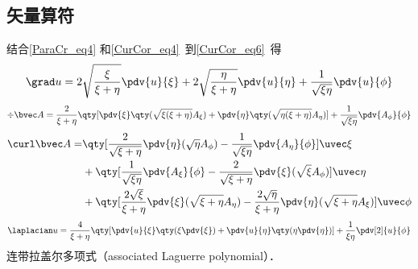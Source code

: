 \subsection{矢量算符}
结合\autoref{ParaCr_eq4} 和\autoref{CurCor_eq4}~到\autoref{CurCor_eq6}~得
\begin{equation}
\grad u = 2\sqrt{\frac{\xi}{\xi + \eta}}\pdv{u}{\xi} + 2\sqrt{\frac{\eta}{\xi + \eta}}\pdv{u}{\eta} + \frac{1}{\sqrt{\xi\eta}}\pdv{u}{\phi}
\end{equation}
\begin{equation}
\div \bvec A = \frac{2}{\xi + \eta}\qty[\pdv{\xi}\qty(\sqrt{\xi(\xi+\eta)}A_\xi) + \pdv{\eta}\qty(\sqrt{\eta(\xi+\eta)}A_\eta)] + \frac{1}{\sqrt{\xi\eta}} \pdv{A_\phi}{\phi}
\end{equation}
\begin{equation}
\begin{aligned}
\curl \bvec A = &\qty[\frac{2}{\sqrt{\xi+\eta}}\pdv{\eta} (\sqrt{\eta}A_\phi) - \frac{1}{\sqrt{\xi\eta}}\pdv{A_\eta}{\phi}]\uvec \xi\\
&+\qty[\frac{1}{\sqrt{\xi\eta}}\pdv{A_\xi}{\phi} - \frac{2}{\sqrt{\xi+\eta}}\pdv{\xi}(\sqrt{\xi}A_\phi)]\uvec\eta\\
&+\qty[\frac{2\sqrt{\xi}}{\xi+\eta}\pdv{\xi}(\sqrt{\xi+\eta}A_\eta) - \frac{2\sqrt{\eta}}{\xi+\eta}\pdv{\eta}(\sqrt{\xi+\eta}A_\xi)]\uvec\phi
\end{aligned}
\end{equation}
\begin{equation} %
\laplacian u = \frac{4}{\xi + \eta} \qty[\pdv{u}{\xi}\qty(\xi\pdv{\xi}) + \pdv{u}{\eta}\qty(\eta\pdv{\eta})] + \frac{1}{\xi\eta}\pdv[2]{u}{\phi}
\end{equation}
连带拉盖尔多项式（associated Laguerre polynomial）．%
